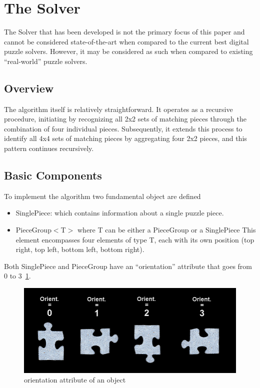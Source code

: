 \documentclass{article}
\begin{document}
\section{The Solver}\label{document:my_solver}
The Solver that has been developed is not the primary focus of this
paper and cannot be considered state-of-the-art when compared
to the current best digital puzzle solvers. However, it may be
considered as such when compared to existing ``real-world'' puzzle solvers.

\subsection{Overview}
The algorithm itself is relatively straightforward.
It operates as a recursive procedure, initiating by recognizing all 2x2
sets of matching pieces through the combination of four individual pieces.
Subsequently, it extends this process to identify all 4x4 sets of matching pieces
by aggregating four 2x2 pieces, and this pattern continues recursively.

\subsection{Basic Components}
To implement the algorithm two fundamental object are defined
\begin{itemize}
  \item SinglePiece: which contains information about a single puzzle piece.
  \item PieceGroup\(<\)T\(>\) where T can be either a PieceGroup or a SinglePiece\newline
  This element encompasses four elements of type T, each with its own position (top right, top left, bottom left, bottom right).
\end{itemize}
Both SinglePiece and PieceGroup have an ``orientation'' attribute that goes from 0 to 3~\cref{fig:orientation}.
\begin{figure}[H]
  \caption{orientation attribute of an object}\label{fig:orientation}
  \centering
  \includegraphics[height=0.3\textwidth]{pictures/orientation.png}
\end{figure}
\end{document}
